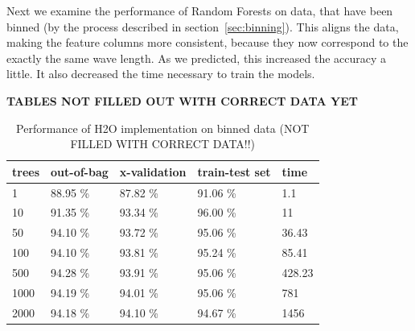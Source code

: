 \documentclass[thesis=B,english]{FITthesis}[2012/10/20]
\begin{document}
Next we examine the performance of Random Forests on data, that have been binned (by the process described in section~\ref{sec:binning}). This aligns the data, making the feature columns more consistent, because they now correspond to the exactly the same wave length. As we predicted, this increased the accuracy a little. It also decreased the time necessary to train the models.

\textbf{TABLES NOT FILLED OUT WITH CORRECT DATA YET}

\begin{table}[h]
\begin{tabular}{|l|l|l|l|l|}
\hline
trees        & out-of-bag & x-validation & train-test set & time \\ \hline
1            &88.95 \%            &87.82 \%              &91.06 \%                 & 1.1        \\ \hline
10           &91.35 \%            &93.34 \%              &96.00 \%                 & 11       \\ \hline
50           &94.10 \%            &93.72 \%              &95.06 \%                 & 36.43      \\ \hline
100          &94.10 \%            &93.81 \%              &95.24 \%                 & 85.41      \\ \hline
500          &94.28 \%            &93.91 \%              &95.06 \%                 & 428.23     \\ \hline
1000         &94.19 \%            &94.01 \%              &95.06 \%                 & 781        \\ \hline
2000         &94.18 \%            &94.10 \%              &94.67 \%                 & 1456       \\ \hline
\end{tabular}
\caption{Performance of H2O implementation on binned data (NOT FILLED WITH CORRECT DATA!!)}
\label{tab:h2o-binned}
\end{table}
\end{document}
